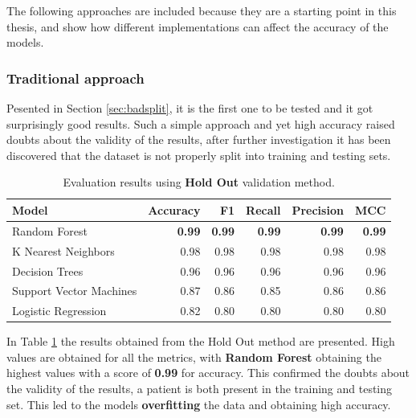             The following approaches are included because they are a starting point in this thesis, and show how different implementations can affect the accuracy of the models.
            
            \subsubsection{Traditional approach}
                
                Pesented in Section \ref{sec:badsplit}, it is the first one to be tested and it got surprisingly good results. Such a simple approach and yet high accuracy raised doubts about the validity of the results, after further investigation it has been discovered that the dataset is not properly split into training and testing sets. 
            
                \begin{table}[htbp]
                    \centering
                    \begin{tabular}{lrrrrr}
                        \toprule
                        \textbf{Model} & \textbf{Accuracy} & \textbf{F1} & \textbf{Recall} & \textbf{Precision} & \textbf{MCC} \\
                        \midrule
                        Random Forest & \textbf{0.99} & \textbf{0.99} & \textbf{0.99} & \textbf{0.99} & \textbf{0.99} \\
                        K Nearest Neighbors & 0.98 & 0.98 & 0.98 & 0.98 & 0.98 \\
                        Decision Trees & 0.96 & 0.96 & 0.96 & 0.96 & 0.96 \\
                        Support Vector Machines & 0.87 & 0.86 & 0.85 & 0.86 & 0.86 \\
                        Logistic Regression & 0.82 & 0.80 & 0.80 & 0.80 & 0.80 \\
                        \bottomrule
                    \end{tabular}
                    \caption{Evaluation results using \textbf{Hold Out} validation method.}
                    \label{tab:wrong_approach_holdout}
                \end{table}

                In Table \ref{tab:wrong_approach_holdout} the results obtained from the Hold Out method are presented. High values are obtained for all the metrics, with \textbf{Random Forest} obtaining the highest values with a score of \textbf{0.99} for accuracy. This confirmed the doubts about the validity of the results, a patient is both present in the training and testing set. This led to the models \textbf{overfitting} the data and obtaining high accuracy.

